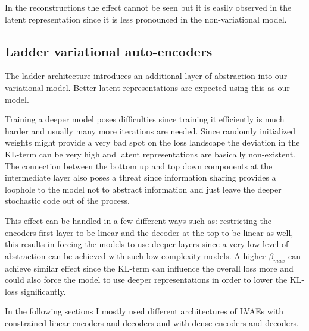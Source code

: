 \documentclass[12pt, english]{article}
\begin{document}
\vspace{4mm}

\par In the reconstructions the effect cannot be seen but it is easily observed in the latent representation since it is less pronounced in the non-variational model.

\newpage

\subsection{Ladder variational auto-encoders}

\vspace{5mm}

\par The ladder architecture introduces an additional layer of abstraction into our variational model. Better latent representations are expected using this as our model.

\vspace{4mm}

\par Training a deeper model poses difficulties since training it efficiently is much harder and usually many more iterations are needed. Since randomly initialized weights might provide a very bad spot on the loss landscape the deviation in the KL-term can be very high and latent representations are basically non-existent. The connection between the bottom up and top down components at the intermediate layer also poses a threat since information sharing provides a loophole to the model not to abstract information and just leave the deeper stochastic code out of the process. 

\vspace{4mm}

\par This effect can be handled in a few different ways such as: restricting the encoders first layer to be linear and the decoder at the top to be linear as well, this results in forcing the models to use deeper layers since a very low level of abstraction can be achieved with such low complexity models. A higher $\beta_{max}$ can achieve similar effect since the KL-term can influence the overall loss more and could also force the model to use deeper representations in order to lower the KL-loss significantly. 

\vspace{4mm}

\par In the following sections I mostly used different architectures of LVAEs with constrained linear encoders and decoders and with dense encoders and decoders.
\end{document}
